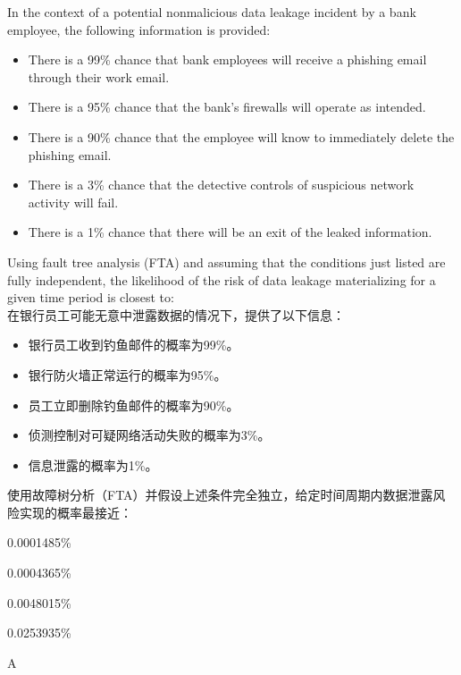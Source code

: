 \documentclass{article}
\newcounter{question} %
\begin{document}
\begin{question}
    In the context of a potential nonmalicious data leakage incident by a bank employee, the following information is provided:
    \begin{itemize}
        \item There is a 99\% chance that bank employees will receive a phishing email through their work email.
        \item There is a 95\% chance that the bank's firewalls will operate as intended.
        \item There is a 90\% chance that the employee will know to immediately delete the phishing email.
        \item There is a 3\% chance that the detective controls of suspicious network activity will fail.
        \item There is a 1\% chance that there will be an exit of the leaked information.
    \end{itemize}
    Using fault tree analysis (FTA) and assuming that the conditions just listed are fully independent, the likelihood of the risk of data leakage materializing for a given time period is closest to:
    \\在银行员工可能无意中泄露数据的情况下，提供了以下信息：
    \begin{itemize}
        \item 银行员工收到钓鱼邮件的概率为99\%。
        \item 银行防火墙正常运行的概率为95\%。
        \item 员工立即删除钓鱼邮件的概率为90\%。
        \item 侦测控制对可疑网络活动失败的概率为3\%。
        \item 信息泄露的概率为1\%。
    \end{itemize}
    使用故障树分析（FTA）并假设上述条件完全独立，给定时间周期内数据泄露风险实现的概率最接近：
\end{question}

\begin{choices}
    \item 0.0001485\%
    \item 0.0004365\%
    \item 0.0048015\%
    \item 0.0253935\%
\end{choices}

\begin{correctanswer}
    A
\end{correctanswer}
\end{document}
